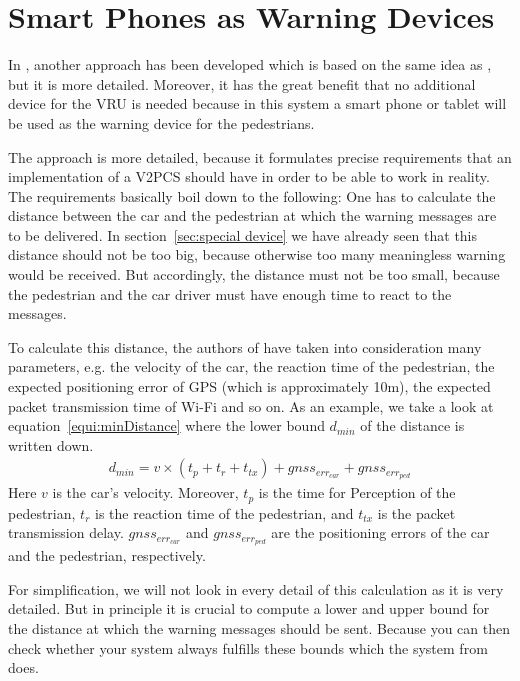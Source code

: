 \documentclass[]{ccs-thesis}
\begin{document}
\section{Smart Phones as Warning Devices}\label{sec:smartphone}

In \cite{v2pcomm}, another approach has been developed which is based on the same idea as \cite{v2pprotection}, but it is more detailed. Moreover, it has the great benefit that no additional device for the \ac{VRU} is needed because in this system a smart phone or tablet will be used as the warning device for the pedestrians.

The approach is more detailed, because it formulates precise requirements that an implementation of a \ac{V2PCS} should have in order to be able to work in reality. The  requirements basically boil down to the following: One has to calculate the distance between the car and the pedestrian at which the warning messages are to be delivered. In section~\ref{sec:special device} we have already seen that this distance should not be too big, because otherwise too many meaningless warning would be received. But accordingly, the distance must not be too small, because the pedestrian and the car driver must have enough time to react to the messages.

To calculate this distance, the authors of \cite{v2pcomm} have taken into consideration many parameters, e.g. the velocity of the car, the reaction time of the pedestrian, the expected positioning error of GPS (which is approximately 10m), the expected packet transmission time of Wi-Fi and so on. As an example, we take a look at equation~\ref{equi:minDistance} where the lower bound $d_{min}$ of the distance is written down.
\begin{align}
d_{min}=v \times (t_p+t_r+t_{tx})+gnss_{err_{car}}+gnss_{err_{ped}}\label{equi:minDistance}
\end{align}
Here $v$ is the car's velocity. Moreover, $t_p$ is the time for Perception of the pedestrian, $t_r$ is the reaction time of the pedestrian, and $t_{tx}$ is the packet transmission delay. $gnss_{err_{car}}$ and $gnss_{err_{ped}}$ are the positioning errors of the car and the pedestrian, respectively.

For simplification, we will not look in every detail of this calculation as it is very detailed. But in principle it is crucial to compute a lower and upper bound for the distance at which the warning messages should be sent. Because you can then check whether your system always fulfills these bounds which the system from \cite{v2pcomm} does.
\end{document}
